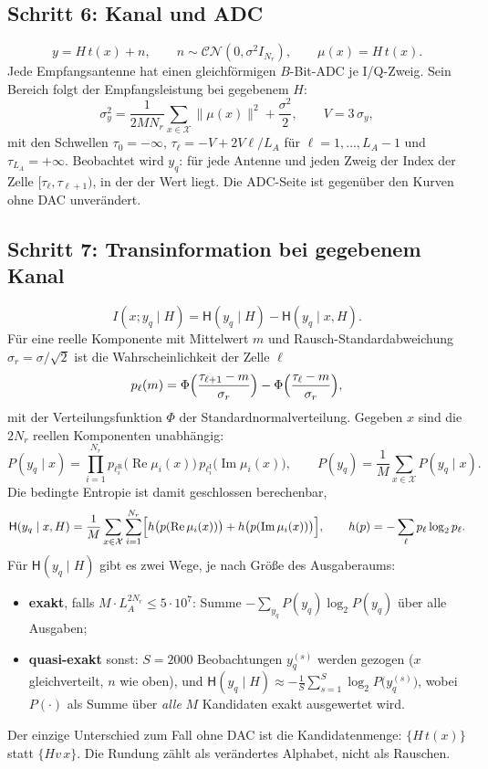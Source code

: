 \documentclass[11pt,a4paper]{article}
\newcommand{\re}{\operatorname{Re}}
\newcommand{\im}{\operatorname{Im}}
\newcommand{\schritt}[1]{\subsection*{Schritt #1}}
\begin{document}
\schritt{6: Kanal und ADC}
\begin{equation}
y=H\,t(x)+n,\qquad n\sim\mathcal{CN}(0,\sigma^2I_{N_r}),\qquad \mu(x)=H\,t(x).
\end{equation}
Jede Empfangsantenne hat einen gleichförmigen $B$-Bit-ADC je I/Q-Zweig. Sein Bereich folgt der
Empfangsleistung bei gegebenem $H$:
\begin{equation}
\sigma_y^2=\frac{1}{2MN_r}\sum_{x\in\mathcal X}\|\mu(x)\|^2+\frac{\sigma^2}{2},\qquad V=3\,\sigma_y ,
\end{equation}
mit den Schwellen $\tau_0=-\infty$, $\tau_\ell=-V+2V\ell/L_A$ für $\ell=1,\dots,L_A-1$ und
$\tau_{L_A}=+\infty$. Beobachtet wird $y_q$: für jede Antenne und jeden Zweig der Index der Zelle
$[\tau_\ell,\tau_{\ell+1})$, in der der Wert liegt. Die ADC-Seite ist gegenüber den Kurven ohne DAC
unverändert.

\schritt{7: Transinformation bei gegebenem Kanal}
\begin{equation}
I(x;y_q\mid H)=\mathsf H(y_q\mid H)-\mathsf H(y_q\mid x,H).
\end{equation}
Für eine reelle Komponente mit Mittelwert $m$ und Rausch-Standardabweichung
$\sigma_r=\sigma/\sqrt2$ ist die Wahrscheinlichkeit der Zelle $\ell$
\begin{equation}
p_\ell(m)=\Phi\Bigl(\frac{\tau_{\ell+1}-m}{\sigma_r}\Bigr)-\Phi\Bigl(\frac{\tau_\ell-m}{\sigma_r}\Bigr),
\end{equation}
mit der Verteilungsfunktion $\Phi$ der Standardnormalverteilung. Gegeben $x$ sind die $2N_r$
reellen Komponenten unabhängig:
\begin{equation}
P(y_q\mid x)=\prod_{i=1}^{N_r}p_{\ell_i^{\mathrm R}}\bigl(\re\mu_i(x)\bigr)\,p_{\ell_i^{\mathrm I}}\bigl(\im\mu_i(x)\bigr),\qquad
P(y_q)=\frac1M\sum_{x\in\mathcal X}P(y_q\mid x).
\end{equation}
Die bedingte Entropie ist damit geschlossen berechenbar,
\begin{equation}
\mathsf H(y_q\mid x,H)=\frac1M\sum_{x\in\mathcal X}\sum_{i=1}^{N_r}\Bigl[h\bigl(p(\re\mu_i(x))\bigr)+h\bigl(p(\im\mu_i(x))\bigr)\Bigr],\qquad
h(p)=-\sum_\ell p_\ell\log_2p_\ell .
\end{equation}
Für $\mathsf H(y_q\mid H)$ gibt es zwei Wege, je nach Größe des Ausgaberaums:
\begin{itemize}[leftmargin=1.4em,itemsep=0.15em,topsep=0.2em]
\item \textbf{exakt}, falls $M\cdot L_A^{2N_r}\le5\cdot10^7$: Summe
$-\sum_{y_q}P(y_q)\log_2P(y_q)$ über alle Ausgaben;
\item \textbf{quasi-exakt} sonst: $S=2000$ Beobachtungen $y_q^{(s)}$ werden gezogen
($x$ gleichverteilt, $n$ wie oben), und
$\mathsf H(y_q\mid H)\approx-\frac1S\sum_{s=1}^S\log_2P\bigl(y_q^{(s)}\bigr)$, wobei $P(\cdot)$ als
Summe über \emph{alle} $M$ Kandidaten exakt ausgewertet wird.
\end{itemize}
Der einzige Unterschied zum Fall ohne DAC ist die Kandidatenmenge: $\{H\,t(x)\}$ statt
$\{H v\,x\}$. Die Rundung zählt als verändertes Alphabet, nicht als Rauschen.
\end{document}

